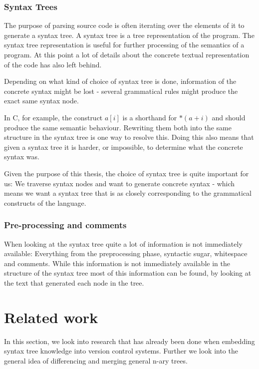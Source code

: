 \documentclass[11pt]{article}
\begin{document}
\subsubsection{Syntax Trees}
The purpose of parsing source code is often iterating over the elements of it to generate a syntax tree. A syntax tree is a tree representation of the program. The syntax tree representation is useful for further processing of the semantics of a program. At this point a lot of details about the concrete textual representation of the code has also left behind.

Depending on what kind of choice of syntax tree is done, information of the concrete syntax might be lost - several grammatical rules might produce the exact same syntax node.

In C, for example, the construct $a[i]$ is a shorthand for $*(a + i)$ and should produce the same semantic behaviour. Rewriting them both into the same structure in the syntax tree is one way to resolve this. Doing this also means that given a syntax tree it is harder, or impossible, to determine what the concrete syntax was.

Given the purpose of this thesis, the choice of syntax tree is quite important for us: We traverse syntax nodes and want to generate concrete syntax - which means we want a syntax tree that is as closely corresponding to the grammatical constructs of the language.

\subsubsection{Pre-processing and comments}
When looking at the syntax tree quite a lot of information is not immediately available: Everything from the preprocessing phase, syntactic sugar, whitespace and comments. While this information is not immediately available in the structure of the syntax tree most of this information can be found, by looking at the text that generated each node in the tree. 


\clearpage
\section{Related work}
In this section, we look into research that has already been done when embedding syntax tree knowledge into version control systems. Further we look into the general idea of differencing and merging general n-ary trees.
\end{document}
